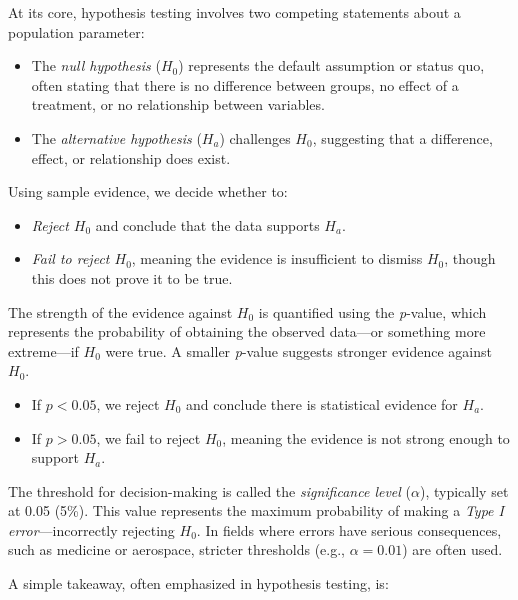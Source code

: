 \documentclass[
  11pt,
]{book}
\providecommand{\tightlist}{%
  \setlength{\itemsep}{0pt}\setlength{\parskip}{0pt}}
\theoremstyle{definition}
\theoremstyle{definition}
\theoremstyle{definition}
\theoremstyle{definition}
\theoremstyle{remark}
\begin{document}
At its core, hypothesis testing involves two competing statements about a population parameter:

\begin{itemize}
\tightlist
\item
  The \emph{null hypothesis} (\(H_0\)) represents the default assumption or status quo, often stating that there is no difference between groups, no effect of a treatment, or no relationship between variables.\\
\item
  The \emph{alternative hypothesis} (\(H_a\)) challenges \(H_0\), suggesting that a difference, effect, or relationship does exist.
\end{itemize}

Using sample evidence, we decide whether to:

\begin{itemize}
\tightlist
\item
  \emph{Reject \(H_0\)} and conclude that the data supports \(H_a\).\\
\item
  \emph{Fail to reject \(H_0\)}, meaning the evidence is insufficient to dismiss \(H_0\), though this does not prove it to be true.
\end{itemize}

The strength of the evidence against \(H_0\) is quantified using the \emph{p}-value, which represents the probability of obtaining the observed data---or something more extreme---if \(H_0\) were true. A smaller \emph{p}-value suggests stronger evidence against \(H_0\).

\begin{itemize}
\tightlist
\item
  If \(p < 0.05\), we reject \(H_0\) and conclude there is statistical evidence for \(H_a\).\\
\item
  If \(p > 0.05\), we fail to reject \(H_0\), meaning the evidence is not strong enough to support \(H_a\).
\end{itemize}

The threshold for decision-making is called the \emph{significance level} (\(\alpha\)), typically set at 0.05 (5\%). This value represents the maximum probability of making a \emph{Type I error}---incorrectly rejecting \(H_0\). In fields where errors have serious consequences, such as medicine or aerospace, stricter thresholds (e.g., \(\alpha = 0.01\)) are often used.

A simple takeaway, often emphasized in hypothesis testing, is:
\end{document}
